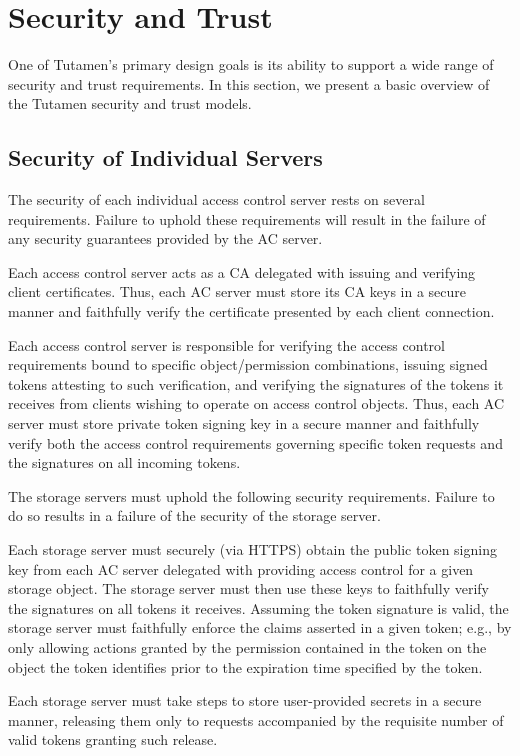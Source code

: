 \section{Security and Trust}
\label{sec:trust}

One of Tutamen's primary design goals is its ability to support a wide
range of security and trust requirements. In this section, we present
a basic overview of the Tutamen security and trust models.

\subsection{Security of Individual Servers}

The security of each individual access control server rests on several
requirements. Failure to uphold these requirements will result in the
failure of any security guarantees provided by the AC server.

\begin{packed_desc}
\item[Certificate Authority Role:] Each access control server acts as
  a CA delegated with issuing and verifying client certificates. Thus,
  each AC server must store its CA keys in a secure manner and
  faithfully verify the certificate presented by each client
  connection.
\item[Token Issuance and Verification:] Each access control server is
  responsible for verifying the access control requirements bound to
  specific object/permission combinations, issuing signed tokens
  attesting to such verification, and verifying the signatures of the
  tokens it receives from clients wishing to operate on access control
  objects. Thus, each AC server must store private token signing key
  in a secure manner and faithfully verify both the access control
  requirements governing specific token requests and the signatures on
  all incoming tokens.
\end{packed_desc}

The storage servers must uphold the following security
requirements. Failure to do so results in a failure of the security of
the storage server.

\begin{packed_desc}
\item[Token Verification:] Each storage server must securely (via
  HTTPS) obtain the public token signing key from each AC server
  delegated with providing access control for a given storage
  object. The storage server must then use these keys to faithfully
  verify the signatures on all tokens it receives. Assuming the token
  signature is valid, the storage server must faithfully enforce the
  claims asserted in a given token; e.g., by only allowing actions
  granted by the permission contained in the token on the object the
  token identifies prior to the expiration time specified by the
  token.
\item[Secure Storage:] Each storage server must take steps to store
  user-provided secrets in a secure manner, releasing them only to
  requests accompanied by the requisite number of valid tokens
  granting such release.
\end{packed_desc}

